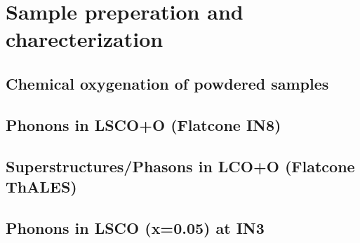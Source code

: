 \chapter{Sample preperation and charecterization}
\section{Chemical oxygenation of powdered samples}
\section{Phonons in LSCO+O (Flatcone IN8)}
\section{Superstructures/Phasons in LCO+O (Flatcone ThALES)}
\section{Phonons in LSCO (x=0.05) at IN3}